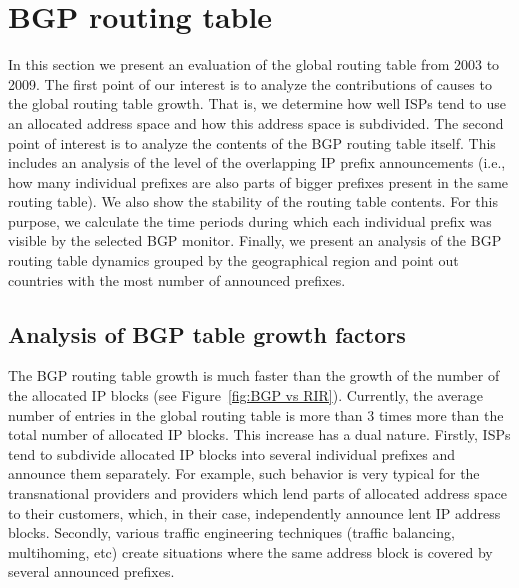 \section{BGP routing table}
\label{sec:bgp}

In this section we present an evaluation of the global routing table from 2003
to 2009. The first point of our interest is to analyze the contributions of
causes to the global routing table growth. That is, we determine how well ISPs
tend to use an allocated address space and how this address space is
subdivided. The second point of interest is to analyze the contents of the BGP
routing table itself. This includes an analysis of the level of the
overlapping IP prefix announcements (i.e., how many individual prefixes are
also parts of bigger prefixes present in the same routing table). We also show
the stability of the routing table contents. For this purpose, we calculate
the time periods during which each individual prefix was visible by the
selected BGP monitor. Finally, we present an analysis of the BGP routing table
dynamics grouped by the geographical region and point out countries with the
most number of announced prefixes.

\subsection{Analysis of BGP table growth factors}

The BGP routing table growth is much faster than the growth of the number of
the allocated IP blocks (see Figure~\ref{fig:BGP vs RIR}). Currently, the
average number of entries in the global routing table is more than 3 times
more than the total number of allocated IP blocks. This increase has a dual
nature. Firstly, ISPs tend to subdivide allocated IP blocks into several
individual prefixes and announce them separately. For example, such behavior
is very typical for the transnational providers and providers which lend parts
of allocated address space to their customers, which, in their case,
independently announce lent IP address blocks. Secondly, various traffic
engineering techniques (traffic balancing, multihoming, etc) create situations
where the same address block is covered by several announced prefixes.

